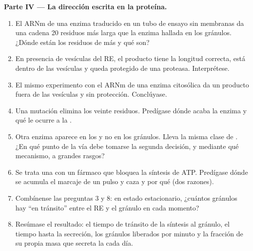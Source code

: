 \begin{problem}
\medskip
\noindent\textbf{Parte IV --- La dirección escrita en la proteína.}
\begin{enumerate}[resume]
  \item El ARNm de una enzima traducido en un tubo de ensayo sin membranas
        da una cadena \qty{20}{} residuos más larga que la enzima hallada
        en los gránulos. ¿Dónde están los residuos de más y qué son?
  \item En presencia de vesículas del RE, el producto tiene la longitud
        correcta, está dentro de las vesículas y queda protegido de una
        proteasa. Interprétese.
  \item El mismo experimento con el ARNm de una enzima citosólica da un
        producto fuera de las vesículas y sin protección. Conclúyase.
  \item Una mutación elimina los veinte residuos. Predígase dónde acaba la
        enzima y qué le ocurre a la .
  \item Otra enzima aparece en los  y no en los gránulos. Lleva la
        misma clase de . ¿En qué punto de la vía debe
        tomarse la segunda decisión, y mediante qué mecanismo, a grandes
        rasgos?
  \item Se trata una  con un fármaco que bloquea la síntesis de ATP.
        Predígase dónde se acumula el marcaje de un pulso y caza y por qué
        (dos razones).
  \item Combínense las preguntas 3 y 8: en estado estacionario, ¿cuántos
        gránulos hay ``en tránsito'' entre el RE y el gránulo en cada
        momento?
  \item Resúmase el resultado: el tiempo de tránsito de la síntesis al
        gránulo, el tiempo hasta la secreción, los gránulos liberados por
        minuto y la fracción de su propia masa que secreta la  cada
        día.
\end{enumerate}
\end{problem}
